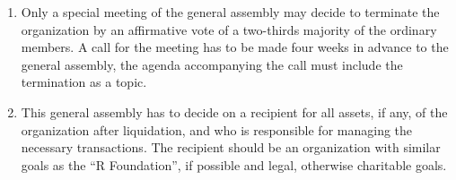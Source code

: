 \documentclass[a4paper]{article}
\newcommand{\RF}{``R Foundation''}
\begin{document}
\begin{enumerate}
 \item Only a special meeting of the general assembly may decide to
  terminate the organization by an affirmative vote of a two-thirds
  majority of the ordinary members.  A call for the meeting has to be
  made four weeks in advance to the general assembly, the agenda
  accompanying the call must include the termination as a topic.
  
 \item This general assembly has to decide on a recipient for all
  assets, if any, of the organization after liquidation, and who is
  responsible for managing the necessary transactions.  The recipient
  should be an organization with similar goals as the \RF{}, if
  possible and legal, otherwise charitable goals.
\end{enumerate}
\end{document}
